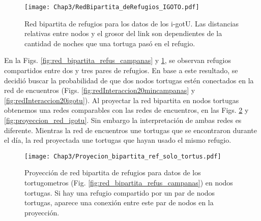 \begin{figure}[ht]
    \begin{center}
        \texttt{[image: Chap3/RedBipartita\_deRefugios\_IGOTO.pdf]}
        \caption[Red bipartita de refugios para los datos de los i-gotU.]{Red bipartita de refugios para los datos de los i-gotU. Las distancias relativas entre nodos y el grosor del link son dependientes de la cantidad de noches que una  tortuga pasó en el refugio. }
        \label{fig:red_bipartita_refus_igotu}
       
        \end{center}
\end{figure}
En la Figs. \ref{fig:red_bipartita_refus_campanas} y \ref{fig:red_bipartita_refus_igotu}, se observan refugios compartidos entre dos y tres pares de refugios.  En base a este resultado, se decidió buscar la probabilidad de que dos nodos tortugas estén conectados en la red de encuentros (Figs. \ref{fig:redInteraccion20mincampanas} y \ref{fig:redInteraccion20igotu}). Al proyectar la red bipartita en nodos tortugas obtenemos una redes comparables con las redes de encuentros, en las Figs. \ref{fig:proyeccion_red_campanas} y \ref{fig:proyeccion_red_igotu}. Sin embargo la interpretación de ambas redes es diferente. Mientras la red de encuentros une tortugas que se encontraron durante el día, la red proyectada une tortugas que hayan usado el mismo refugio.
 
 
\begin{figure}[ht]
    \begin{center}
        \texttt{[image: Chap3/Proyecion\_bipartita\_ref\_solo\_tortus.pdf]}
        \caption[Proyección  de red bipartita de refugios para datos de los tortugometros en nodos tortugas.]{Proyección  de red bipartita de refugios para datos de los tortugometros (Fig. \ref{fig:red_bipartita_refus_campanas}) en nodos tortugas. Si hay una refugio compartido por un par de nodos tortugas, aparece una conexión entre este par de nodos en la proyección. }
        \label{fig:proyeccion_red_campanas}
       
        \end{center}
\end{figure}
 
